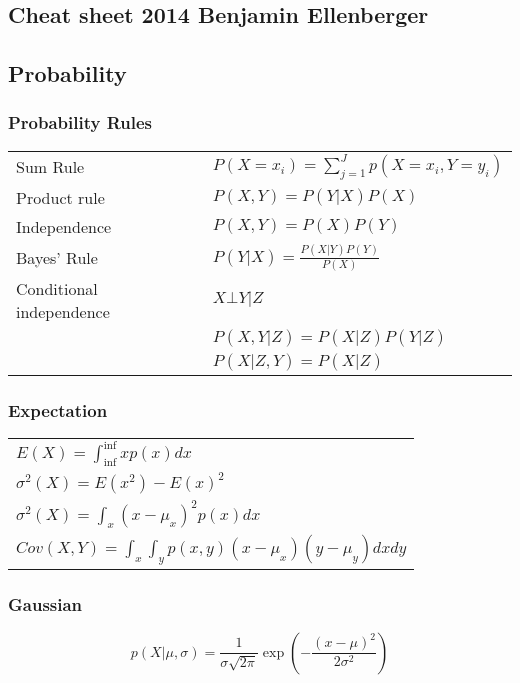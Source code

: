 \documentclass[main]{subfiles}
\begin{document}
\begin{landscape}
\ifx\cheatsheet\undefined
{}
\else
{\color{sectionColor}\section{Cheat sheet 2014 Benjamin Ellenberger}} %
\fi
%
%
\begin{multicols}{4}
\scriptsize
{\color{subsectionColor}\subsection{Probability}}
{\color{subsubsectionColor}\subsubsection{Probability Rules}}
\begin{tabular}{p{5em}l}
Sum Rule& \(P(X=x_i) = \sum_{j=1}^{J} p(X=x_i,Y=y_i)\)\\
Product rule& \(P(X, Y) = P(Y|X) P(X)\) \\
Independence& \(P(X, Y) = P(X)P(Y)\) \\
Bayes' Rule& \(P(Y|X) = \frac{P(X|Y)P(Y)}{P(X)}\) \\
Conditional independence& \(X\bot Y|Z \)\\
 & \(P(X,Y|Z) = P(X|Z)P(Y|Z)\) \\
 & \(P(X|Z,Y) = P(X|Z)\)
\end{tabular}
{\color{subsubsectionColor}\subsubsection{Expectation}}
\begin{tabular}{l}
\(E(X) = \int_{\inf}^{\inf} x p(x) dx\) \\
\(\sigma^2(X) = E(x^2)-{E(x)}^2\) \\
\(\sigma^2(X) = \int_x (x-\mu_x)^2 p(x) dx\) \\
\(Cov(X, Y) = \int_x \int_y p(x,y) (x-\mu_x)(y-\mu_y) dx dy\)
\end{tabular}

{\color{subsubsectionColor}\subsubsection{Gaussian}}
\begin{equation}
p(X|\mu,\sigma)=\frac{1}{\sigma \sqrt{2\pi}} \exp(-\frac{(x-\mu)^2}{2\sigma^2})
\end{equation}


\end{multicols}
\end{landscape}
\end{document}
